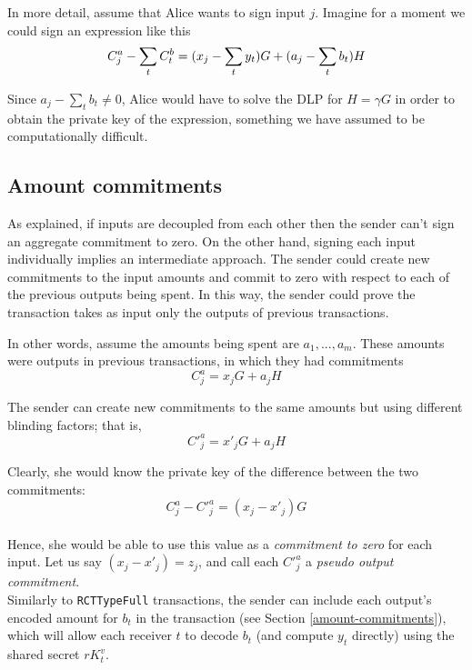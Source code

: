 In more detail, assume that Alice wants to sign input $j$. Imagine for a moment we could sign an expression like this\vspace{.2cm}
\[  C^a_{j} - \sum\limits_t C^b_{t} \\
= (x_j -  \sum_t y_t) G + (a_j - \sum\limits_t  b_t) H \]

Since \(a_j - \sum\limits_t  b_t \ne 0\), Alice would have to solve the DLP for \(H = \gamma G\) in order to obtain the private key of the expression, something we have assumed to be computationally difficult.


\subsection{Amount commitments}
\label{RCTTypeSimple-commitments}

As explained, if inputs are decoupled from each other then the sender can't sign an aggregate commitment to zero. On the other hand, signing each input individually implies an intermediate approach. The sender could create new commitments to the input amounts and commit to zero with respect to each of the previous outputs being spent. In this way, the sender could prove the transaction takes as input only the outputs of previous transactions.

In other words, assume the amounts being spent are \(a_1, ..., a_m\). These amounts were outputs in previous transactions, in which they had commitments\vspace{.2cm}
\[C^a_{j} = x_j G + a_j H\]


The sender can create new commitments to the same amounts but using different blinding factors; that is,
\[C'^a_{j} = x'_j G + a_j H\]

Clearly, she would know the private key of the difference between the two commitments: \vspace{.3cm}
\[ C^a_{j} - C'^a_{j} = (x_j - x'_j) G \] \\
Hence, she would be able to use this value as a {\em commitment to zero} for each input. Let us say $(x_j - x'_j) = z_j$, and call each $C'^a_j$ a {\em pseudo output commitment}.
\\

Similarly to {\tt RCTTypeFull} transactions, the sender can include each output’s encoded amount for $b_t$ in the transaction (see Section \ref{amount-commitments}), which will allow each receiver $t$ to decode $b_t$ (and compute $y_t$ directly) using the shared secret $r K_t^v$.
\\

